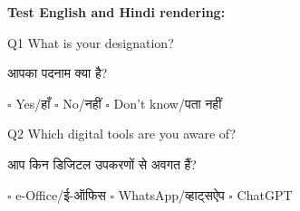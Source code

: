 \documentclass[10pt,a4paper]{article}
\newcommand{\hi}[1]{{\hindifont\small #1}}
\begin{document}
\noindent\textbf{Test English and Hindi rendering:}

\noindent Q1 \quad What is your designation?

\hi{आपका पदनाम क्या है?}

\noindent $\square$ Yes/\hi{हाँ} \quad $\square$ No/\hi{नहीं} \quad $\square$ Don't know/\hi{पता नहीं}

\noindent Q2 \quad Which digital tools are you aware of?

\hi{आप किन डिजिटल उपकरणों से अवगत हैं?}

\noindent $\square$ e-Office/\hi{ई-ऑफिस} \quad $\square$ WhatsApp/\hi{व्हाट्सऐप} \quad $\square$ ChatGPT
\end{document}
